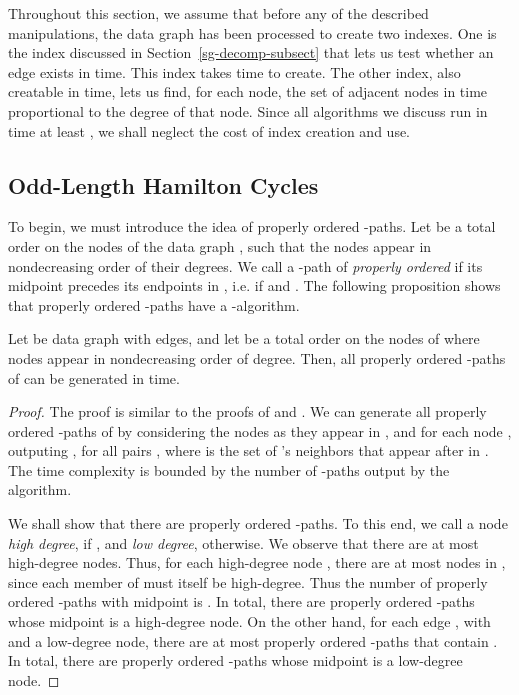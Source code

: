 Throughout this section, we assume that before any of the described manipulations, the data graph has been processed to create two indexes.  One is the index discussed in Section~\ref{sg-decomp-subsect} that lets us test whether an edge exists in  time. This index takes  time to create.
The other index, also creatable in  time, lets us find, for each node, the set of adjacent nodes in time proportional to the degree of that node.
Since all algorithms we discuss run in time at least , we shall neglect the cost of index creation and use.

\subsection{Odd-Length Hamilton Cycles}
\label{odd-cycle-subsect}

To begin, we must introduce the idea of properly ordered -paths. Let  be a total order on the nodes of the data graph , such that the nodes appear in nondecreasing order of their degrees. We call a -path  of  \emph{properly ordered} if its midpoint precedes its endpoints in , i.e. if  and . The following proposition shows that properly ordered -paths have a -algorithm.

\begin{lemma}\label{pr:2-paths}
Let  be data graph with  edges, and let  be a total order on the nodes of  where nodes appear in nondecreasing order of degree. Then, all properly ordered -paths of  can be generated in  time.
\end{lemma}

\begin{proof}
The proof is similar to the proofs of \cite[Theorem~3.5]{AYZ97} and \cite[Theorem~2]{Schank07}. We can generate all properly ordered -paths of  by considering the nodes as they appear in , and for each node , outputing , for all pairs , where  is the set of 's neighbors that appear after  in . The time complexity is bounded by the number of -paths output by the algorithm.

We shall show that there are  properly ordered -paths. To this end, we call a node  \emph{high degree}, if , and \emph{low degree}, otherwise. We observe that there are at most  high-degree nodes. Thus, for each high-degree node , there are at most  nodes in , since each member of  must itself be high-degree. Thus the number of properly ordered -paths with midpoint  is . In total, there are  properly ordered -paths whose midpoint is a high-degree node.
On the other hand, for each edge , with  and  a low-degree node, there are at most  properly ordered -paths  that contain . In total, there are  properly ordered -paths whose midpoint is a low-degree node.
\end{proof}

